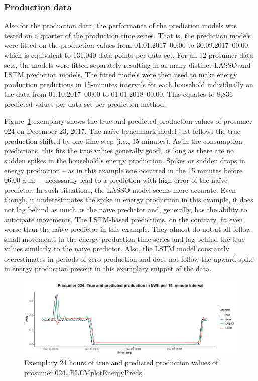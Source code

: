 \subsubsection{Production data}

Also for the production data, the performance of the prediction models was tested on a quarter of the production time series. That is, the prediction models were fitted on the production values from 01.01.2017~00:00 to 30.09.2017~00:00 which is equivalent to 131,040 data points per data set. For all 12 prosumer data sets, the models were fitted separately resulting in as many distinct LASSO and LSTM prediction models. The fitted models were then used to make energy production predictions in 15-minutes intervals for each household individually on the data from 01.10.2017~00:00 to 01.01.2018~00:00. This equates to 8,836 predicted values per data set per prediction method.

Figure~\ref{Fig:glimpse_predprod} exemplary shows the true and predicted production values of prosumer 024 on December 23, 2017. The na\"ive benchmark model just follows the true production shifted by one time step (i.e., 15 minutes). As in the consumption predictions, this fits the true values generally good, as long as there are no sudden spikes in the household's energy production. Spikes or sudden drops in energy production -- as in this example one occurred in the 15 minutes before 06:00 a.m.~-- necessarily lead to a prediction with high error of the na\"ive predictor. In such situations, the LASSO model seems more accurate. Even though, it underestimates the spike in energy production in this example, it does not lag behind as much as the na\"ive predictor and, generally, has the ability to anticipate movements. The LSTM-based predictions, on the contrary, fit even worse than the na\"ive predictor in this example. They almost do not at all follow small movements in the energy production time series and lag behind the true values similarly to the na\"ive predictor. Also, the LSTM model constantly overestimates in periods of zero production and does not follow the upward spike in energy production present in this exemplary snippet of the data.
%
\begin{figure}[htbp]
    \centering
    \includegraphics[width=\textwidth]{thesis/graphs/evaluation/p024_pred_prod.pdf}
    \caption[Exemplary 24 hours of true and predicted production values]{Exemplary 24 hours of true and predicted production values of prosumer 024. \quantnet\href{https://github.com/QuantLet/BLEM/tree/master/BLEMplotEnergyPreds}{BLEMplotEnergyPreds}}
    \label{Fig:glimpse_predprod}
\end{figure}
%

